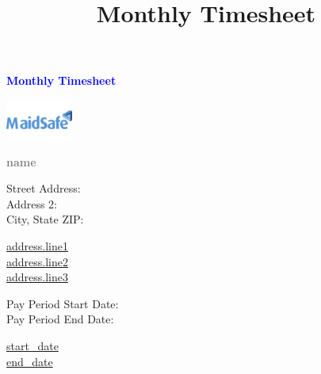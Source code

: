 \documentclass[11pt,a4paper]{article}
\title{Monthly Timesheet}
\begin{document}
\begin{minipage}{0.5\textwidth}
\textbf{\textcolor{blue}{\LARGE{
    Monthly Timesheet
}}}
\end{minipage}
\begin{minipage}{0.25\textwidth}
\begin{flushright}
\includegraphics[height=50px]{images/logo.png}
\end{flushright}
\end{minipage}

\textbf{\textcolor{grey}{\large{
    {{ name }} \\
}}}

\begin{minipage}{0.20\textwidth}
    Street Address: \\
    Address 2: \\
    City, State ZIP:
\end{minipage}
\begin{minipage}{0.25\textwidth}
    \underline{ {{ address.line1 }} } \\
    \underline{ {{ address.line2 }} } \\
    \underline{ {{ address.line3 }} }
\end{minipage}
\begin{minipage}{0.25\textwidth}
    Pay Period Start Date: \\
    Pay Period End Date:
\end{minipage}
\begin{minipage}{0.25\textwidth}
    \underline{ {{ start_date }} } \\
    \underline{ {{ end_date }} }
\end{minipage}
\end{document}
